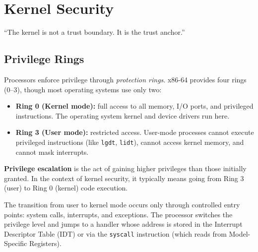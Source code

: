 \chapter{Kernel Security}
\label{ch:kernel}

\epigraph{``The kernel is not a trust boundary. It is the trust anchor.''}{}


\section{Privilege Rings}

Processors enforce privilege through \emph{protection rings}. x86-64 provides four rings (0--3), though most operating systems use only two:

\begin{itemize}
	\item \textbf{Ring 0 (Kernel mode):} full access to all memory, I/O ports, and privileged instructions. The operating system kernel and device drivers run here.
	\item \textbf{Ring 3 (User mode):} restricted access. User-mode processes cannot execute privileged instructions (like \texttt{lgdt}, \texttt{lidt}), cannot access kernel memory, and cannot mask interrupts.
\end{itemize}

\begin{definition}
	\textbf{Privilege escalation} is the act of gaining higher privileges than those initially granted. In the context of kernel security, it typically means going from Ring 3 (user) to Ring 0 (kernel) code execution.
\end{definition}

The transition from user to kernel mode occurs only through controlled entry points: system calls, interrupts, and exceptions. The processor switches the privilege level and jumps to a handler whose address is stored in the Interrupt Descriptor Table (IDT) or via the \texttt{syscall} instruction (which reads from Model-Specific Registers).

